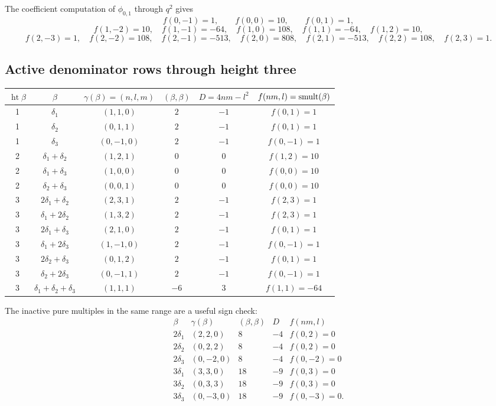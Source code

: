 The coefficient computation of \(\phi_{0,1}\) through \(q^2\) gives
$$
f(0,-1)=1,\qquad f(0,0)=10,\qquad f(0,1)=1,
$$
$$
f(1,-2)=10,\quad f(1,-1)=-64,\quad f(1,0)=108,
\quad f(1,1)=-64,\quad f(1,2)=10,
$$
$$
f(2,-3)=1,\quad f(2,-2)=108,\quad f(2,-1)=-513,
\quad f(2,0)=808,\quad f(2,1)=-513,\quad
f(2,2)=108,\quad f(2,3)=1.
$$

\subsection{Active denominator rows through height three}

\begin{center}
\begingroup
\small
\begin{tabular}{c|c|c|c|c|c}
\(\operatorname{ht}\beta\) &
\(\beta\) &
\(\gamma(\beta)=(n,l,m)\) &
\((\beta,\beta)\) &
\(D=4nm-l^2\) &
\(f(nm,l)=\operatorname{smult}(\beta)\)\\
\hline
1 & \(\delta_1\) & \((1,1,0)\) & \(2\) & \(-1\) & \(f(0,1)=1\)\\
1 & \(\delta_2\) & \((0,1,1)\) & \(2\) & \(-1\) & \(f(0,1)=1\)\\
1 & \(\delta_3\) & \((0,-1,0)\) & \(2\) & \(-1\) & \(f(0,-1)=1\)\\
\hline
2 & \(\delta_1+\delta_2\) & \((1,2,1)\) & \(0\) & \(0\) & \(f(1,2)=10\)\\
2 & \(\delta_1+\delta_3\) & \((1,0,0)\) & \(0\) & \(0\) & \(f(0,0)=10\)\\
2 & \(\delta_2+\delta_3\) & \((0,0,1)\) & \(0\) & \(0\) & \(f(0,0)=10\)\\
\hline
3 & \(2\delta_1+\delta_2\) & \((2,3,1)\) & \(2\) & \(-1\) & \(f(2,3)=1\)\\
3 & \(\delta_1+2\delta_2\) & \((1,3,2)\) & \(2\) & \(-1\) & \(f(2,3)=1\)\\
3 & \(2\delta_1+\delta_3\) & \((2,1,0)\) & \(2\) & \(-1\) & \(f(0,1)=1\)\\
3 & \(\delta_1+2\delta_3\) & \((1,-1,0)\) & \(2\) & \(-1\) & \(f(0,-1)=1\)\\
3 & \(2\delta_2+\delta_3\) & \((0,1,2)\) & \(2\) & \(-1\) & \(f(0,1)=1\)\\
3 & \(\delta_2+2\delta_3\) & \((0,-1,1)\) & \(2\) & \(-1\) & \(f(0,-1)=1\)\\
3 & \(\delta_1+\delta_2+\delta_3\) & \((1,1,1)\) & \(-6\) & \(3\) & \(f(1,1)=-64\)
\end{tabular}
\endgroup
\end{center}

The inactive pure multiples in the same range are a useful sign check:
$$
\begin{array}{c|c|c|c|c}
\beta & \gamma(\beta) & (\beta,\beta)&D&f(nm,l)\\
\hline
2\delta_1&(2,2,0)&8&-4&f(0,2)=0\\
2\delta_2&(0,2,2)&8&-4&f(0,2)=0\\
2\delta_3&(0,-2,0)&8&-4&f(0,-2)=0\\
3\delta_1&(3,3,0)&18&-9&f(0,3)=0\\
3\delta_2&(0,3,3)&18&-9&f(0,3)=0\\
3\delta_3&(0,-3,0)&18&-9&f(0,-3)=0 .
\end{array}
$$

